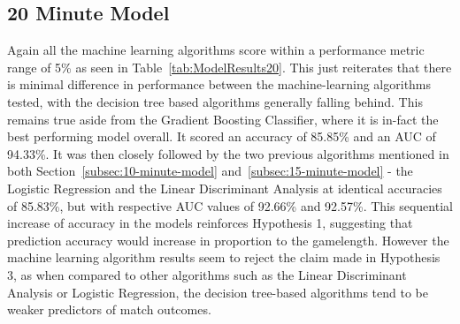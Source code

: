 \newpage

\subsection{20 Minute Model}\label{subsec:20-minute-model}

Again all the machine learning algorithms score within a performance metric range of 5\% as seen in Table~\ref{tab:ModelResults20}.
This just reiterates that there is minimal difference in performance between the machine-learning algorithms tested, with the decision tree based algorithms generally falling behind.
This remains true aside from the Gradient Boosting Classifier, where it is in-fact the best performing model overall.
It scored an accuracy of 85.85\% and an AUC of 94.33\%.
It was then closely followed by the two previous algorithms mentioned in both Section~\ref{subsec:10-minute-model} and~\ref{subsec:15-minute-model} - the Logistic Regression and the Linear Discriminant Analysis at identical accuracies of 85.83\%, but with respective AUC values of 92.66\% and 92.57\%.
This sequential increase of accuracy in the models reinforces Hypothesis 1, suggesting that prediction accuracy would increase in proportion to the gamelength.
However the machine learning algorithm results seem to reject the claim made in Hypothesis 3, as when compared to other algorithms such as the Linear Discriminant Analysis or Logistic Regression, the decision tree-based algorithms tend to be weaker predictors of match outcomes. \\

